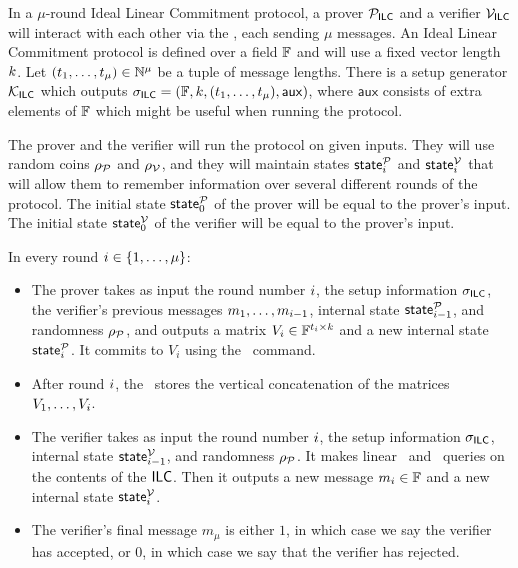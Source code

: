 \begin{definition}

In a $\mu$-round Ideal Linear Commitment protocol, a prover $\mathcal{P}_{\mathsf{ILC}}$ and a verifier $\mathcal{V}_{\mathsf{ILC}}$ will interact with each other via the \ILC, each sending $\mu$ messages. An Ideal Linear Commitment protocol is defined over a field $\mathbb{F}$ and will use a fixed vector length $k$. Let $(t_1,\ldots,t_\mu) \in \mathbb{N}^\mu$ be a tuple of message lengths. There is a setup generator $\mathcal{K}_{\mathsf{ILC}}$ which outputs $\mathsf{\sigma}_{\mathsf{ILC}} = (\mathbb{F},k,(t_1,\ldots,t_\mu),\mathsf{aux})$, where $\mathsf{aux}$ consists of extra elements of $\mathbb{F}$ which might be useful when running the protocol.

The prover and the verifier will run the protocol on given inputs. They will use random coins $\rho_{\mathcal{P}}$ and $\rho_{\mathcal{V}}$, and they will maintain states $\mathsf{state}^{\mathcal{P}}_i$ and $\mathsf{state}^{\mathcal{V}}_i$ that will allow them to remember information over several different rounds of the protocol. The initial state $\mathsf{state}^{\mathcal{P}}_0$ of the prover will be equal to the prover's input. The initial state $\mathsf{state}^{\mathcal{V}}_0$ of the verifier will be equal to the prover's input.

In every round $i \in \{ 1,\ldots,\mu \}$:
\begin{itemize}
\item The prover takes as input the round number $i$, the setup information $\mathsf{\sigma}_{\mathsf{ILC}}$, the verifier's previous messages $m_1,\ldots,m_{i-1}$, internal state $\mathsf{state}^{\mathcal{P}}_{i-1}$, and randomness $\rho_{\mathcal{P}}$, and outputs a matrix $V_i \in \mathbb{F}^{t_i \times k}$ and a new internal state $\mathsf{state}^{\mathcal{P}}_{i}$. It commits to $V_i$ using the \ILCcommit\ command.
\item After round $i$, the \ILC \ stores the vertical concatenation of the matrices $V_1,\ldots,V_i$.
\item The verifier takes as input the round number $i$, the setup information $\mathsf{\sigma}_{\mathsf{ILC}}$, internal state $\mathsf{state}^{\mathcal{V}}_{i-1}$, and randomness $\rho_{\mathcal{P}}$. It makes linear \ILCopen\ and \ILCcheck\ queries on the contents of the $\mathsf{ILC}$. Then it outputs a new message $m_i \in \mathbb{F}$ and a new internal state $\mathsf{state}_i^{\mathcal{V}}$.
\item The verifier's final message $m_\mu$ is either $1$, in which case we say the verifier has accepted, or $0$, in which case we say that the verifier has rejected.
\end{itemize}
\end{definition}


